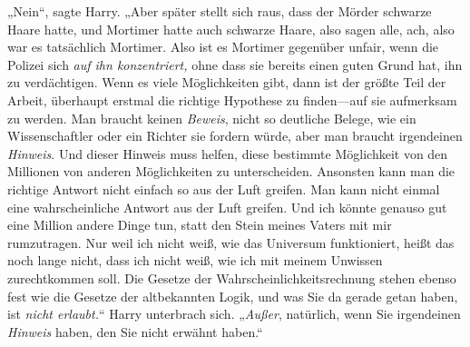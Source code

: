 „Nein“, sagte Harry. „Aber später stellt sich raus, dass der Mörder schwarze Haare hatte, und Mortimer hatte auch schwarze Haare, also sagen alle, ach, also war es tatsächlich Mortimer. Also ist es Mortimer gegenüber unfair, wenn die Polizei sich \emph{auf ihn konzentriert,} ohne dass sie bereits einen guten Grund hat, ihn zu verdächtigen. Wenn es viele Möglichkeiten gibt, dann ist der größte Teil der Arbeit, überhaupt erstmal die richtige Hypothese zu finden—auf sie aufmerksam zu werden. Man braucht keinen \emph{Beweis}, nicht so deutliche Belege, wie ein Wissenschaftler oder ein Richter sie fordern würde, aber man braucht irgendeinen \emph{Hinweis}. Und dieser Hinweis muss helfen, diese bestimmte Möglichkeit von den Millionen von anderen Möglichkeiten zu unterscheiden. Ansonsten kann man die richtige Antwort nicht einfach so aus der Luft greifen. Man kann nicht einmal eine wahrscheinliche Antwort aus der Luft greifen. Und ich könnte genauso gut eine Million andere Dinge tun, statt den Stein meines Vaters mit mir rumzutragen. Nur weil ich nicht weiß, wie das Universum funktioniert, heißt das noch lange nicht, dass ich nicht weiß, wie ich mit meinem Unwissen zurechtkommen soll. Die Gesetze der Wahrscheinlichkeitsrechnung stehen ebenso fest wie die Gesetze der altbekannten Logik, und was Sie da gerade getan haben, ist \emph{nicht erlaubt.}“ Harry unterbrach sich. „\emph{Außer}, natürlich, wenn Sie irgendeinen \emph{Hinweis} haben, den Sie nicht erwähnt haben.“

